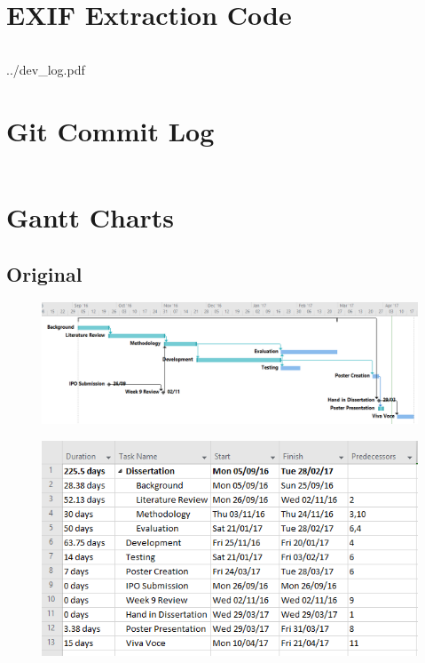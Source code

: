 \section{EXIF Extraction Code}\label{app:exif_code}
	\inputminted[breaklines,
				linenos,
				frame=lines,
				fontsize=\footnotesize,
				firstline=36,
				lastline=63]{python}{../code/program/v2.py}
\clearpage

{../dev_log.pdf}

\clearpage
\section{Git Commit Log}\label{app:commit_log}
\inputminted[breaklines=true]{text}{../git_log.txt}
\clearpage
\section{Gantt Charts}\label{app:gantts}
	\subsection{Original}
		\begin{figure}[h!]
			\includegraphics[width=\textwidth]{../images/gantt/orig/gantt.PNG}
		\end{figure}
		\begin{figure}[h!]
			\includegraphics[]{../images/gantt/orig/tasks.PNG}
		\end{figure}
	\clearpage
